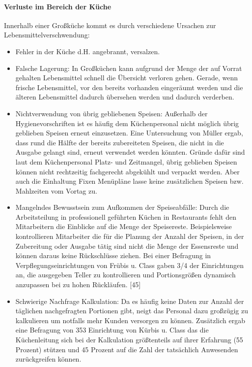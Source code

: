 \paragraph{Verluste im Bereich der Küche}
Innerhalb einer Großküche kommt es durch verschiedene Ursachen zur Lebensmittelverschwendung: 
\begin{itemize}
  \item Fehler in der Küche d.H. angebrannt, versalzen.  %
  \item Falsche Lagerung: In Großküchen kann aufgrund der Menge der auf Vorrat gehalten Lebensmittel schnell die Übersicht verloren gehen. Gerade, wenn frische Lebensmittel, vor den bereits vorhanden eingeräumt werden und die älteren Lebensmittel dadurch übersehen werden und dadurch verderben.  %
  \item Nichtverwendung von übrig gebliebenen Speisen: Außerhalb der Hygienevorschriften ist es häufig dem Küchenpersonal nicht möglich übrig geblieben Speisen erneut einzusetzen. Eine Untersuchung von %
  Müller ergab, dass rund die Hälfte der bereits zubereiteten Speisen, die nicht in die Ausgabe gelangt sind, erneut verwendet werden könnten. Gründe dafür sind laut dem Küchenpersonal Platz- und Zeitmangel, übrig geblieben Speisen können nicht rechtzeitig fachgerecht abgekühlt und verpackt werden. %
  Aber auch die Einhaltung Fixen Menüpläne lasse keine zusätzlichen Speisen bzw. Mahlzeiten vom Vortag zu.
   \item Mangelndes Bewusstsein zum Aufkommen der Speiseabfälle: Durch die Arbeitsteilung in professionell geführten Küchen in Restaurants fehlt den Mitarbeitern die Einblicke auf die Menge der Speisereste. Beispielsweise kontrollieren Mitarbeiter die für die Planung der Anzahl der Speisen, in der Zubereitung oder Ausgabe tätig sind nicht die Menge der Essensreste und können daraus keine Rückschlüsse ziehen. Bei einer Befragung in Verpflegungseinrichtungen von Frübis u. Class gaben 3/4 der Einrichtungen an, die ausgegeben Teller zu kontrollieren und Portionsgrößen dynamisch anzupassen bei zu hohen Rückläufen. [45] %

  \item Schwierige Nachfrage Kalkulation: Da es häufig keine Daten zur Anzahl der täglichen nachgefragten Portionen gibt, neigt das Personal dazu großzügig zu kalkulieren um notfalls mehr Kunden versorgen zu können. Zusätzlich ergab eine Befragung von 353 Einrichtung von Kürbis u. Class das die Küchenleitung sich bei der Kalkulation größtenteils auf ihrer Erfahrung (55 Prozent) stützen und 45 Prozent auf die Zahl der tatsächlich Anwesenden zurückgreifen können. %

\end{itemize}

